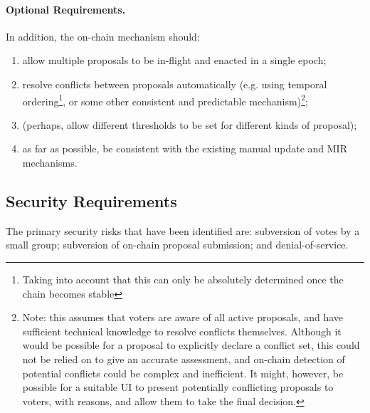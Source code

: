 \paragraph{Optional Requirements.}  In addition, the on-chain mechanism should:

\begin{enumerate}[resume]
\item
  allow multiple proposals to be in-flight and enacted in a single epoch;
\item
  resolve conflicts between proposals automatically (e.g. using temporal ordering\footnote{Taking into account that this can only be absolutely determined once the chain becomes stable}, or some other consistent and predictable mechanism)\footnote{Note: this assumes that voters are aware of all active proposals, and have sufficient technical knowledge to resolve conflicts themselves.  Although it would be possible for a proposal to explicitly declare a conflict set, this could not be relied on to give an accurate assessment, and on-chain detection of potential conflicts could be complex and inefficient. It might, however, be possible for a suitable UI to present potentially conflicting proposals to voters, with reasons, and allow them to take the final decision.};
\item
  (perhaps, allow different thresholds to be set for different kinds of proposal);
\item
  as far as possible, be consistent with the existing manual update and MIR mechanisms.
\end{enumerate}

\pagebreak
\subsection{Security Requirements}
\label{sect:security}

The primary security risks that have been identified are: subversion of votes by a small group; subversion of on-chain proposal submission; and denial-of-service.

